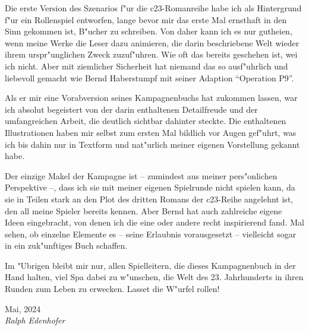
Die erste Version des Szenarios f"ur die c23-Romanreihe habe ich als Hintergrund f"ur ein Rollenspiel entworfen, lange bevor mir das erste Mal ernsthaft in den Sinn gekommen ist, B"ucher zu schreiben. Von daher kann ich es nur guthei\3en, wenn meine Werke die Leser dazu animieren, die darin beschriebene Welt wieder ihrem urspr"unglichen Zweck zuzuf"uhren. Wie oft das bereits geschehen ist, wei\3 ich nicht. Aber mit ziemlicher Sicherheit hat niemand das so ausf"uhrlich und liebevoll gemacht wie Bernd Haberstumpf mit seiner Adaption ``Operation P9''.

Als er mir eine Vorabversion seines Kampagnenbuchs hat zukommen lassen, war ich absolut begeistert von der darin enthaltenen Detailfreude und der umfangreichen Arbeit, die deutlich sichtbar dahinter steckte. Die enthaltenen Illustrationen haben mir selbst zum ersten Mal bildlich vor Augen gef"uhrt, was ich bis dahin nur in Textform und nat"urlich meiner eigenen Vorstellung gekannt habe.

Der einzige Makel der Kampagne ist -- zumindest aus meiner pers"onlichen Perspektive --, dass ich sie mit meiner eigenen Spielrunde nicht spielen kann, da sie in Teilen stark an den Plot des dritten Romans der c23-Reihe angelehnt ist, den all meine Spieler bereits kennen. Aber Bernd hat auch zahlreiche eigene Ideen eingebracht, von denen ich die eine oder andere recht inspirierend fand. Mal sehen, ob einzelne Elemente es -- seine Erlaubnis vorausgesetzt -- vielleicht sogar in ein zuk"unftiges Buch schaffen.

Im "Ubrigen bleibt mir nur, allen Spielleitern, die dieses Kampagnenbuch in der Hand halten, viel Spa\3 dabei zu w"unschen, die Welt des 23. Jahrhunderts in ihren Runden zum Leben zu erwecken. Lasset die W"urfel rollen!

\medskip
Mai, 2024\\
\emph{Ralph Edenhofer}
